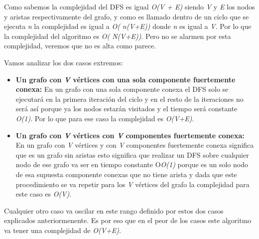 Como sabemos la complejidad del DFS es igual {\em O(V + E)} siendo {\em V} y {\em E} los nodos y aristas respectivamente del grafo, y como es llamado dentro de un ciclo que se ejecuta {\em n} la complejidad es igual a {\em O( n(V+E))} donde {\em n} es igual a {\em V}. Por lo que la complejidad del algoritmo es {\em O( N(V+E))}. Pero no se alarmen por esta complejidad, veremos que no es alta como parece.

Vamos analizar los dos casos extremos:

\begin{itemize}
	\item {\bf Un grafo con {\em V} vértices con una sola componente fuertemente conexa:} En un grafo con una sola componente conexa el DFS solo se ejecutará en la primera iteración del ciclo y en el resto de la iteraciones no será así porque ya los nodos estarán visitados y el tiempo será constante {\em O(1)}. Por lo que para ese caso la complejidad es {\em O(V+E)}.
	
	\item {\bf Un grafo con {\em V} vértices con {\em V} componentes fuertemente conexa:} En un grafo con {\em V} vértices y con {\em V} componentes fuertemente conexa significa que es un grafo sin aristas esto significa que realizar un DFS sobre cualquier nodo de ese grafo va ser en tiempo constante O{\em O(1)} porque es un solo nodo de esa supuesta componente conexas que no tiene arista y dada que este procedimiento se va repetir para los {\em V} vértices del grafo la complejidad para este caso es {\em O(V)}.
	
\end{itemize}

Cualquier otro caso va oscilar en este rango definido por estos dos casos explicados anteriormenente. Es por eso que en el peor de los casos este algoritmo va tener una complejidad
de {\em O(V+E)}.
